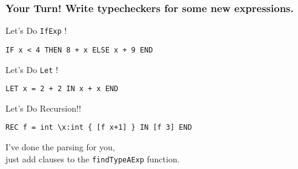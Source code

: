 \documentclass{beamer}
\begin{document}
\begin{frame}[fragile]
\frametitle{Your Turn! Write typecheckers for some new expressions.}

{\LARGE Let's Do {\tt IfExp} !}

\begin{verbatim}
IF x < 4 THEN 8 + x ELSE x + 9 END
\end{verbatim}

\bigskip
{\LARGE Let's Do {\tt Let} !}

\begin{verbatim}
LET x = 2 + 2 IN x + x END
\end{verbatim}

\bigskip
{\LARGE Let's Do Recursion!!}
\begin{verbatim}
REC f = int \x:int { [f x+1] } IN [f 3] END
\end{verbatim}

\bigskip


I've done the parsing for you, \\just add clauses  to the
{\tt findTypeAExp} function.

\end{frame}
\end{document}
